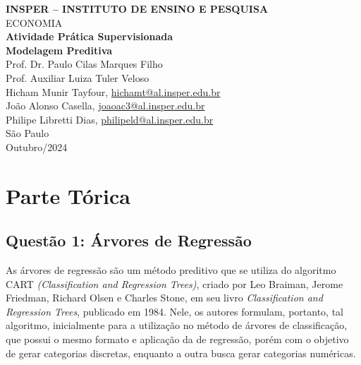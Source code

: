 \documentclass[a4paper,12pt]{article}[abntex2]
\begin{document}
\begin{titlepage}
    \centering
    \vspace*{1cm}
    \Large\textbf{INSPER – INSTITUTO DE ENSINO E PESQUISA}\\
    \Large ECONOMIA\\
    \vspace{1.5cm}
    \Large\textbf{Atividade Prática Supervisionada}\\
    \textbf{Modelagem Preditiva}\\
    \vspace{1.5cm}
    Prof. Dr. Paulo Cilas Marques Filho \\
    Prof. Auxiliar Luiza Tuler Veloso \\
    \vfill
    \normalsize
    Hicham Munir Tayfour, \href{mailto:hichamt@al.insper.edu.br}{hichamt@al.insper.edu.br}\\
    João Alonso Casella, \href{mailto:joaoac3@al.insper.edu.br}{joaoac3@al.insper.edu.br}\\
    Philipe Libretti Dias, \href{mailto:philipeld@al.insper.edu.br}{philipeld@al.insper.edu.br}\\

    \vfill
    São Paulo\\
    Outubro/2024
\end{titlepage}

\newpage
\tableofcontents
\thispagestyle{empty} %

\newpage 
\listoffigures
\thispagestyle{empty} %

\newpage
\setcounter{page}{1} %
\justify
\onehalfspacing

\section*{\textbf{Parte Tórica}}

\subsection*{Questão 1: Árvores de Regressão}

As árvores de regressão são um método preditivo que se utiliza do algoritmo CART \textit{(Classification and Regression Trees)}, criado por Leo Braiman, Jerome Friedman, Richard Olsen e Charles Stone, em seu livro \textit{Classification and Regression Trees}, publicado em 1984. Nele, os autores formulam, portanto, tal algoritmo, inicialmente para a utilização no método de árvores de classificação, que possui o mesmo formato e aplicação da de regressão, porém com o objetivo de gerar categorias discretas, enquanto a outra busca gerar categorias numéricas.
\end{document}
